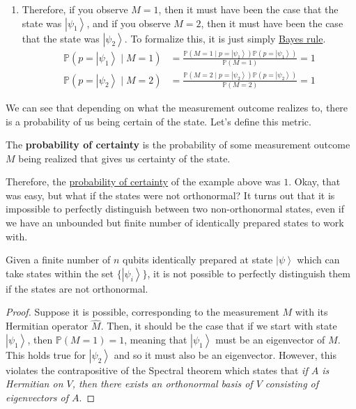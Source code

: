 \documentclass{article}
\newcommand{\ket}[1]{\ensuremath{\left|#1\right\rangle}}
\newcounter{theorem}[section]
\newcounter{definition}[section]
\newcounter{example}[section]
\begin{document}
\begin{example}
\begin{enumerate}
        \item Therefore, if you observe $M = 1$, then it must have been the case that the state was $\ket{\psi_1}$, and if you observe $M = 2$, then it must have been the case that the state was $\ket{\psi_2}$. To formalize this, it is just simply \hyperref[prob-thm:bayes-rule]{Bayes rule}. 
          \begin{align}
            \mathbb{P}(p = \ket{\psi_1} \mid M = 1) & = \frac{\mathbb{P}(M = 1 \mid p = \ket{\psi_1}) \mathbb{P}(p = \ket{\psi_1})}{\mathbb{P}(M = 1)} = 1 \\
            \mathbb{P}(p = \ket{\psi_2} \mid M = 2) & = \frac{\mathbb{P}(M = 2 \mid p = \ket{\psi_2}) \mathbb{P}(p = \ket{\psi_2})}{\mathbb{P}(M = 2)} = 1
          \end{align}
      \end{enumerate}
    \end{example}

    We can see that depending on what the measurement outcome realizes to, there is a probability of us being certain of the state. Let's define this metric. 

    \begin{definition}
      \label{def:probability-of-certainty}
      The \textbf{probability of certainty} is the probability of some measurement outcome $M$ being realized that gives us certainty of the state. 
    \end{definition}

    Therefore, the \hyperref[def:probability-of-certainty]{probability of certainty} of the example above was $1$. Okay, that was easy, but what if the states were not orthonormal? It turns out that it is impossible to perfectly distinguish between two non-orthonormal states, even if we have an unbounded but finite number of identically prepared states to work with. 

    \begin{lemma}
      \label{thm:distinguishing-non-orthonormal-states}
      Given a finite number of $n$ qubits identically prepared at state $\ket{\psi}$ which can take states within the set $\{ \ket{\psi_i}\}$, it is not possible to perfectly distinguish them if the states are not orthonormal. 
    \end{lemma}
    \begin{proof}
      Suppose it is possible, corresponding to the measurement $M$ with its Hermitian operator $\hat{M}$. Then, it should be the case that if we start with state $\ket{\psi_1}$, then $\mathbb{P}(M = 1) = 1$, meaning that $\ket{\psi_1}$ must be an eigenvector of $M$. This holds true for $\ket{\psi_2}$ and so it must also be an eigenvector. However, this violates the contrapositive of the Spectral theorem which states that \textit{if $A$ is Hermitian on $V$, then there exists an orthonormal basis of $V$ consisting of eigenvectors of $A$}. 
    \end{proof}
\end{document}
